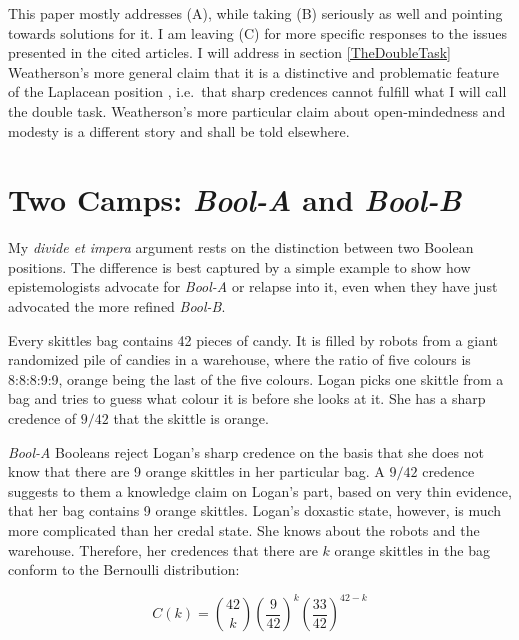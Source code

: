 \documentclass[11pt]{article}
\newcommand{\anderson}[0]{\textit{Bool-A}}
\newcommand{\augustin}[0]{\textit{Bool-B}}
\begin{document}
This paper mostly addresses (A), while taking (B) seriously as well
and pointing towards solutions for it. I am leaving (C) for more
specific responses to the issues presented in the cited articles. I
will address in section \ref{TheDoubleTask} Weatherson's more general
claim that it is a distinctive and problematic feature of the
Laplacean position 
, i.e.\ that sharp credences cannot fulfill
what I will call the double task. Weatherson's more
particular claim about open-mindedness and modesty is a different
story and shall be told elsewhere.

\section{Two Camps: {\anderson} and {\augustin}}
\label{PlebeiansAndAristocrats}

My \emph{divide et impera} argument rests on the distinction between
two Boolean positions. The difference is best captured by a simple
example to show how epistemologists advocate for {\anderson} or
relapse into it, even when they have just advocated the more refined
{\augustin}.

\begin{quotex}
  \label{ex:skittles} Every skittles bag contains
  42 pieces of candy. It is filled by robots from a giant randomized
  pile of candies in a warehouse, where the ratio of five colours is
  8:8:8:9:9, orange being the last of the five colours. Logan picks
  one skittle from a bag and tries to guess what colour it is before
  she looks at it. She has a sharp credence of $9/42$ that the skittle
  is orange.
\end{quotex}

{\anderson} Booleans reject Logan's sharp credence on the basis
that she does not know that there are 9 orange skittles in her
particular bag. A $9/42$ credence suggests to them a knowledge claim
on Logan's part, based on very thin evidence, that her bag contains 9
orange skittles. Logan's doxastic state, however, is much more
complicated than her credal state. She knows about the robots and the
warehouse. Therefore, her credences that there are $k$ orange skittles
in the bag conform to the Bernoulli distribution:

\begin{equation}
  \label{eq:bern}
  C(k)=\binom{42}{k}\left(\frac{9}{42}\right)^{k}\left(\frac{33}{42}\right)^{42-k}
\end{equation}
\end{document}
